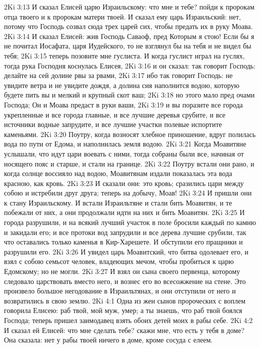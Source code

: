 2Ki 3:13  И сказал Елисей царю Израильскому: что мне и тебе? пойди к пророкам отца твоего и к пророкам матери твоей. И сказал ему царь Израильский: нет, потому что Господь созвал сюда трех царей сих, чтобы предать их в руку Моава.
2Ki 3:14  И сказал Елисей: жив Господь Саваоф, пред Которым я стою! Если бы я не почитал Иосафата, царя Иудейского, то не взглянул бы на тебя и не видел бы тебя;
2Ki 3:15  теперь позовите мне гуслиста. И когда гуслист играл на гуслях, тогда рука Господня коснулась Елисея,
2Ki 3:16  и он сказал: так говорит Господь: делайте на сей долине рвы за рвами,
2Ki 3:17  ибо так говорит Господь: не увидите ветра и не увидите дождя, а долина сия наполнится водою, которую будете пить вы и мелкий и крупный скот ваш;
2Ki 3:18  но этого мало пред очами Господа; Он и Моава предаст в руки ваши,
2Ki 3:19  и вы поразите все города укрепленные и все города главные, и все лучшие деревья срубите, и все источники водные запрудите, и все лучшие участки полевые испортите каменьями.
2Ki 3:20  Поутру, когда возносят хлебное приношение, вдруг полилась вода по пути от Едома, и наполнилась земля водою.
2Ki 3:21  Когда Моавитяне услышали, что идут цари воевать с ними, тогда собраны были все, начиная от носящего пояс и старше, и стали на границе.
2Ki 3:22  Поутру встали они рано, и когда солнце воссияло над водою, Моавитянам издали показалась эта вода красною, как кровь.
2Ki 3:23  И сказали они: это кровь; сразились цари между собою и истребили друг друга; теперь на добычу, Моав!
2Ki 3:24  И пришли они к стану Израильскому. И встали Израильтяне и стали бить Моавитян, и те побежали от них, а они продолжали идти на них и бить Моавитян.
2Ki 3:25  И города разрушили, и на всякий лучший участок в поле бросили каждый по камню и закидали его; и все протоки вод запрудили и все дерева лучшие срубили, так что оставались только каменья в Кир-Харешете. И обступили его пращники и разрушили его.
2Ki 3:26  И увидел царь Моавитский, что битва одолевает его, и взял с собою семьсот человек, владеющих мечом, чтобы пробиться к царю Едомскому; но не могли.
2Ki 3:27  И взял он сына своего первенца, которому следовало царствовать вместо него, и вознес его во всесожжение на стене. Это произвело большое негодование в Израильтянах, и они отступили от него и возвратились в свою землю.
2Ki 4:1  Одна из жен сынов пророческих с воплем говорила Елисею: раб твой, мой муж, умер; а ты знаешь, что раб твой боялся Господа; теперь пришел заимодавец взять обоих детей моих в рабы себе.
2Ki 4:2  И сказал ей Елисей: что мне сделать тебе? скажи мне, что есть у тебя в доме? Она сказала: нет у рабы твоей ничего в доме, кроме сосуда с елеем.
